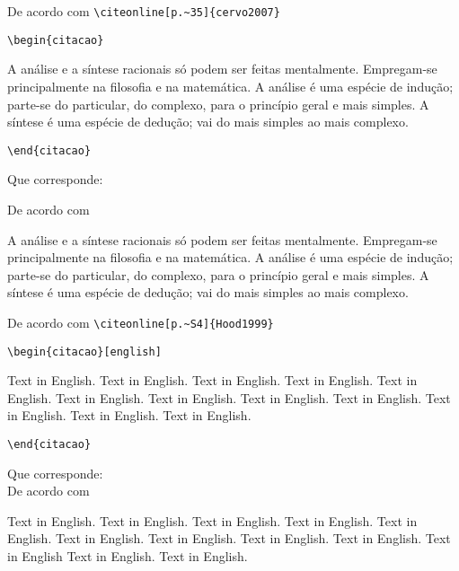 \begin{alineas} 

\item 
De acordo com \verb+\citeonline[p.~35]{cervo2007}+

\verb+\begin{citacao}+

A an\'alise e a síntese racionais só podem ser feitas mentalmente. Empregam-se principalmente na filosofia e na matem\'atica. A an\'alise \'e uma esp\'ecie de indução; parte-se do particular, do complexo, para o princípio geral e mais simples. A síntese \'e uma esp\'ecie de dedução; vai do mais simples ao mais complexo.

\verb+\end{citacao}+

Que corresponde: 

De acordo com 

\begin{citacao}
A an\'alise e a síntese racionais só podem ser feitas mentalmente. Empregam-se principalmente na filosofia e na matem\'atica. A an\'alise \'e uma esp\'ecie de indução; parte-se do particular, do complexo, para o princípio geral e mais simples. A síntese \'e uma esp\'ecie de dedução; vai do mais simples ao mais complexo.
\end{citacao}

\item
De acordo com \verb+\citeonline[p.~S4]{Hood1999}+

\verb+\begin{citacao}[english]+

Text in English. Text in English. Text in English. Text in
English. Text in English. Text in English. Text in English. 
Text in English. Text in English. Text in English. Text in
English. Text in English.

\verb+\end{citacao}+

Que corresponde: \\

 De acordo com 
\begin{citacao}[english]
	Text in English. Text in English. Text in English. Text in English. Text in English. Text in English. Text in English. Text in English. Text in English. Text in English Text in English. Text in English.
\end{citacao}

\end{alineas}


